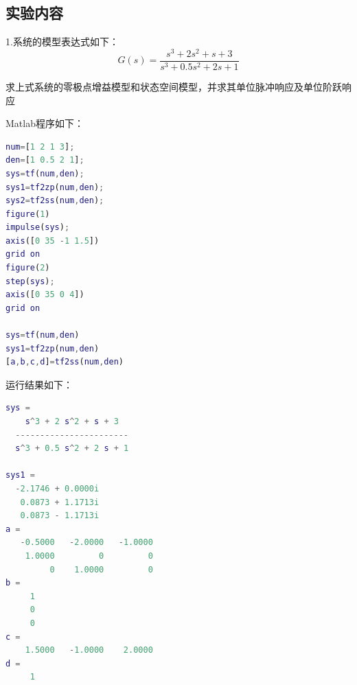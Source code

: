 \documentclass[UTF8]{ctexart}
\begin{document}
\subsection{实验内容 }
\par 1.系统的模型表达式如下：
\begin{equation}
G(s)= \frac{s^{3}+2s^{2}+s+3}{s^{3}+0.5s^{2}+2s+1}
 \end{equation}
 
\par 求上式系统的零极点增益模型和状态空间模型，并求其单位脉冲响应及单位阶跃响应
\par Matlab程序如下：
\par  \begin{lstlisting}[language=matlab,escapeinside=``]
num=[1 2 1 3];
den=[1 0.5 2 1];
sys=tf(num,den);
sys1=tf2zp(num,den);
sys2=tf2ss(num,den);
figure(1)
impulse(sys);
axis([0 35 -1 1.5])
grid on
figure(2)
step(sys);
axis([0 35 0 4])
grid on

sys=tf(num,den)
sys1=tf2zp(num,den)
[a,b,c,d]=tf2ss(num,den)
\end{lstlisting}

\par 运行结果如下：
\par  \begin{lstlisting}[language=matlab,escapeinside=``]
sys =
    s^3 + 2 s^2 + s + 3
  -----------------------
  s^3 + 0.5 s^2 + 2 s + 1

sys1 =
  -2.1746 + 0.0000i
   0.0873 + 1.1713i
   0.0873 - 1.1713i
a =
   -0.5000   -2.0000   -1.0000
    1.0000         0         0
         0    1.0000         0
b =
     1
     0
     0
c =
    1.5000   -1.0000    2.0000
d =
     1
\end{lstlisting}
\end{document}
